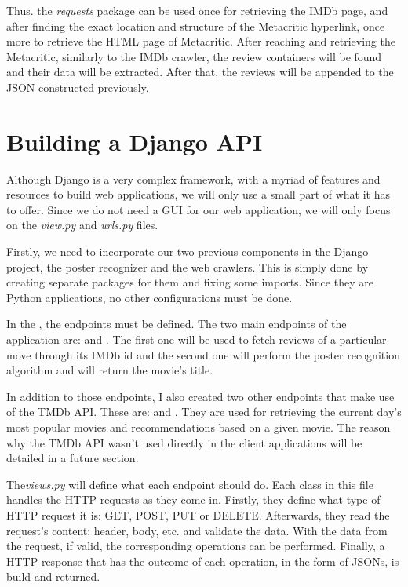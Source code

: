 \documentclass[12pt,a4paper,twoside]{report}
\begin{document}
Thus. the \textit{requests} package can be used once for retrieving the IMDb page, and after finding the exact location and structure of the Metacritic hyperlink, once more to retrieve the HTML page of Metacritic. 
After reaching and retrieving the Metacritic, similarly to the IMDb crawler, the review containers will be found and their data will be extracted. After that, the reviews will be appended to the JSON constructed previously.


\section{Building a Django API}

Although Django is a very complex framework, with a myriad of features and resources to build web applications, we will only use a small part of what it has to offer. Since we do not need a GUI for our web application, we will only focus on the \textit{view.py} and \textit{urls.py} files. 

Firstly, we need to incorporate our two previous components in the Django project, the poster recognizer and the web crawlers. This is simply done by creating separate packages for them and fixing some imports. Since they are Python applications, no other configurations must be done.

In the , the endpoints must be defined. The two main endpoints of the application are:  and . The first one will be used to fetch reviews of a particular move through its IMDb id and the second one will perform the poster recognition algorithm and will return the movie's title.

In addition to those endpoints, I also created two other endpoints that make use of the TMDb API. These are:  and . They are used for retrieving the current day's most popular movies and recommendations based on a given movie. The reason why the TMDb API wasn't used directly in the client applications will be detailed in a future section.

The\textit{views.py} will define what each endpoint should do. Each class in this file handles the HTTP requests as they come in. Firstly, they define what type of HTTP request it is: GET, POST, PUT or DELETE. Afterwards, they read the request's content: header, body, etc. and validate the data. With the data from the request, if valid, the corresponding operations can be performed. Finally, a HTTP response that has the outcome of each operation, in the form of JSONs, is build and returned.
\end{document}
